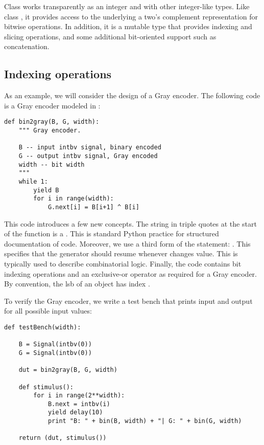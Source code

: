Class  works transparently as an integer and with other
integer-like types. Like class , it provides access to the
underlying a two's complement representation for bitwise
operations. In addition, it is a mutable type that provides indexing
and slicing operations, and some additional bit-oriented support such
as concatenation.

\subsection{Indexing operations}
\label{gray}
As an example, we will consider the design of a Gray encoder. The
following code is a Gray encoder modeled in \myhdl{}:

\begin{verbatim}
def bin2gray(B, G, width):
    """ Gray encoder.

    B -- input intbv signal, binary encoded
    G -- output intbv signal, Gray encoded
    width -- bit width
    """
    while 1:
        yield B
        for i in range(width):
            G.next[i] = B[i+1] ^ B[i]

\end{verbatim}

This code introduces a few new concepts. The string in triple quotes
at the start of the function is a . This is standard
Python practice for structured documentation of code. Moreover, we
use a third form of the  statement:
. This specifies that the generator should
resume whenever  changes value. This is typically used to
describe combinatorial logic.
Finally, the code contains bit indexing operations and an exclusive-or
operator as required for a Gray encoder. By convention, the lsb of an
 object has index .

To verify the Gray encoder, we write a test bench that prints input
and output for all possible input values:

\begin{verbatim}
def testBench(width):
    
    B = Signal(intbv(0))
    G = Signal(intbv(0))
    
    dut = bin2gray(B, G, width)

    def stimulus():
        for i in range(2**width):
            B.next = intbv(i)
            yield delay(10)
            print "B: " + bin(B, width) + "| G: " + bin(G, width)

    return (dut, stimulus())

\end{verbatim}

